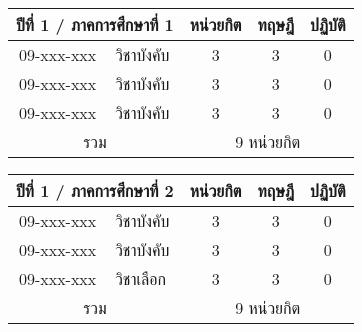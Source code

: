 \renewcommand{\arraystretch}{1.4}
\begin{tabular}{|cp{}|ccc|}
\hline
\multicolumn{2}{|c|}{ปีที่ 1 / ภาคการศึกษาที่ 1} & \multicolumn{1}{c|}{หน่วยกิต} & \multicolumn{1}{c|}{ทฤษฎี} & \multicolumn{1}{c|}{ปฏิบัติ}  \\ \hline
\multicolumn{1}{|c|}{09-xxx-xxx}  & วิชาบังคับ  & \multicolumn{1}{c|}{3}        & \multicolumn{1}{c|}{3}     & \multicolumn{1}{c|}{0}                    \\ \hline
\multicolumn{1}{|c|}{09-xxx-xxx}  & วิชาบังคับ  & \multicolumn{1}{c|}{3}        & \multicolumn{1}{c|}{3}     & \multicolumn{1}{c|}{0}                    \\ \hline
\multicolumn{1}{|c|}{09-xxx-xxx}  & วิชาบังคับ  & \multicolumn{1}{c|}{3}        & \multicolumn{1}{c|}{3}     & \multicolumn{1}{c|}{0}                    \\ \hline
\multicolumn{2}{|c|}{รวม}                        & \multicolumn{3}{c|}{9 หน่วยกิต}                                                                            \\ \hline
\end{tabular}

\vspace{5ex}\par\noindent
\renewcommand{\arraystretch}{1.4}
\begin{tabular}{|cp{}|ccc|}
\hline
\multicolumn{2}{|c|}{ปีที่ 1 / ภาคการศึกษาที่ 2} & \multicolumn{1}{c|}{หน่วยกิต} & \multicolumn{1}{c|}{ทฤษฎี} & \multicolumn{1}{c|}{ปฏิบัติ}  \\ \hline
\multicolumn{1}{|c|}{09-xxx-xxx}  & วิชาบังคับ  & \multicolumn{1}{c|}{3}        & \multicolumn{1}{c|}{3}     & \multicolumn{1}{c|}{0}                    \\ \hline
\multicolumn{1}{|c|}{09-xxx-xxx}  & วิชาบังคับ  & \multicolumn{1}{c|}{3}        & \multicolumn{1}{c|}{3}     & \multicolumn{1}{c|}{0}                    \\ \hline
\multicolumn{1}{|c|}{09-xxx-xxx}  & วิชาเลือก  & \multicolumn{1}{c|}{3}        & \multicolumn{1}{c|}{3}     & \multicolumn{1}{c|}{0}                    \\ \hline
\multicolumn{2}{|c|}{รวม}                        & \multicolumn{3}{c|}{9 หน่วยกิต}                                                                            \\ \hline
\end{tabular}


